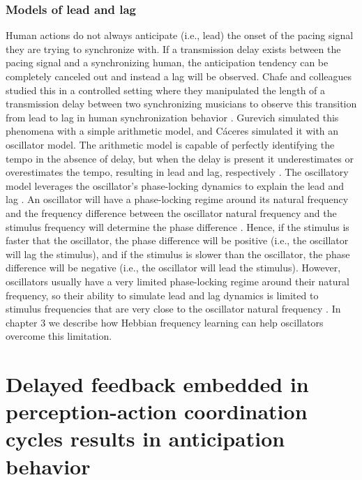 \documentclass{report}
\begin{document}
\subsection{Models of lead and lag} 
Human actions do not always anticipate (i.e., lead) the onset of the pacing signal they are trying to synchronize with. If a transmission delay exists between the pacing signal and a synchronizing human, the anticipation tendency can be completely canceled out and instead a lag will be observed. Chafe and colleagues studied this in a controlled setting where they manipulated the length of a transmission delay between two synchronizing musicians to observe this transition from lead to lag in human synchronization behavior \cite{chafe2010effect}. Gurevich \cite{gurevish2004simulation} simulated this phenomena with a simple arithmetic model, and C\'{a}ceres \cite{caceres2013synchronization} simulated it with an oscillator model. The arithmetic model is capable of perfectly identifying the tempo in the absence of delay, but when the delay is present it underestimates or overestimates the tempo, resulting in lead and lag, respectively \cite{gurevish2004simulation}. The oscillatory model leverages the oscillator's phase-locking dynamics to explain the lead and lag \cite{caceres2013synchronization}. An oscillator will have a phase-locking regime around its natural frequency and the frequency difference between the oscillator natural frequency and the stimulus frequency will determine the phase difference \cite{kim2015signal}. Hence, if the stimulus is faster that the oscillator, the phase difference will be positive (i.e., the oscillator will lag the stimulus), and if the stimulus is slower than the oscillator, the phase difference will be negative (i.e., the oscillator will lead the stimulus). However, oscillators usually have a very limited phase-locking regime around their natural frequency, so their ability to simulate lead and lag dynamics is limited to stimulus frequencies that are very close to the oscillator natural frequency \cite{kim2015signal}. In chapter 3 we describe how Hebbian frequency learning can help oscillators overcome this limitation. 


\chapter{Delayed feedback embedded in perception-action coordination cycles results in anticipation behavior}
\end{document}
